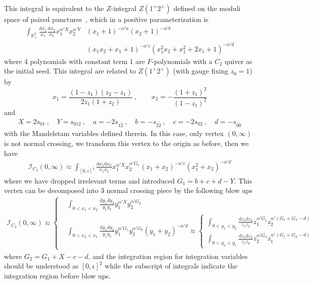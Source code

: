 \documentclass[12pt]{article}
\theoremstyle{definition}
\theoremstyle{plain}
\newcommand{\dif}{\mathrm{d}} %
\begin{document}
This integral is equivalent to the $Z$-integral $Z(1^{+}2^{+})$ defined on the moduli space of paired punctures~\cite{Li:2018mnq}, which in a positive parameterization is 
\begin{align*}
\int_{\mathbb R_+^2} \frac{\dif x_1}{x_1}\frac{\dif x_2}{x_2}x_1^{\alpha' X}x_2^{\alpha' Y}
&(x_1 + 1)^{-\alpha' a} 
(x_2 + 1)^{-\alpha' b}\\
&(x_1x_2 + x_1 + 1)^{-\alpha' c}
(x_1^2x_2 + x_1^2 + 2x_1 + 1)^{-\alpha' d} 
\end{align*}
where 4 polynomials with constant term 1 are $F$-polynomials with a $C_{2}$ quiver as the initial seed.
This integral are related to $Z(1^{+}2^{+})$ (with gauge fixing $z_{0}=1$) by 
\begin{equation*}
	x_{1}=\frac{(1-z_{1})(z_{2}-z_{1})}{2z_{1}(1+z_{2})} \:,\qquad x_{2}=-\frac{(1+z_{1})^{2}}{(1-z_{1})^{2}}
\end{equation*}
and
\begin{align*}
	X=2s_{01}\:,\quad Y=s_{012}\:,\quad a=-2s_{1\tilde{2}}\:,\quad b=-s_{2\tilde{2}}\:,\quad 
	c=-2s_{02}\:,\quad d=-s_{0\tilde{0}}
\end{align*}
with the Mandelstam variables defined therein. In this case, only vertex $(0,\infty)$ is not normal crossing, we transform this vertex to the origin as before, then we have
\begin{align*}
	\mathcal{I}_{C_{2}}(0,\infty)\approx \int_{[0,\epsilon]^{2}} \frac{\dif x_{1}\dif x_{2}}{x_{1}x_{2}} x_{1}^{\alpha' X}x_{2}^{\alpha' G_{1}}
	(x_{1}+x_{2})^{-\alpha' c} (x_{1}^{2}+x_{2})^{-\alpha' d}
\end{align*}
where we have dropped irrelevant terms and introduced $G_{1}=b+c+d-Y$. This vertex can be decomposed into 3 normal crossing piece by the following blow ups
\begin{align*}
	\mathcal{I}_{C_{2}}(0,\infty)\approx\left\{
	\begin{aligned}
		&\int_{0<x_{1}<x_{2}}\frac{\dif y_{1}\dif y_{2}}{y_{1}y_{2}} y_{1}^{\alpha' X}y_{2}^{\alpha' G_{2}} \\
		&\int_{0<x_{2}<x_{1}}\frac{\dif y_{1}\dif y_{2}}{y_{1}y_{2}} y_{1}^{\alpha' G_{1}}y_{2}^{\alpha' G_{2}}(y_{1}+y_{2})^{-\alpha'd} \approx
		\left\{\begin{aligned}
			\int_{0<y_{1}<y_{2}}\frac{\dif z_{1} \dif z_{2}}{z_{1}z_{2}}z_{1}^{\alpha' G_{1}}
			z_{2}^{\alpha'(G_{1}+G_{2}-d)} \\
			\int_{0<y_{2}<y_{1}}\frac{\dif z_{1}\dif z_{2}}{z_{1}z_{2}} z_{2}^{\alpha' G_{2}}
			z_{1}^{\alpha'(G_{1}+G_{2}-d)}
		\end{aligned} \right. 
	\end{aligned} \right.
\end{align*}
where $G_{2}=G_{1}+X-c-d$, and the integration region for integration variables should be understood as $[0,\epsilon]^{2}$ while the subscript of integrals indicate the integration region before blow ups.
\end{document}
